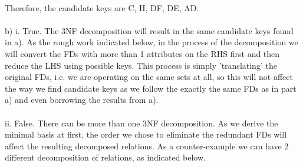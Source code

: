 \documentclass[12pt]{article}
\begin{document}
\\
Therefore, the candidate keys are C, H, DF, DE, AD.\\
\\
b) i. True. The 3NF decomposition will result in the same candidate keys found in a). As the rough work indicated below, in the process of the decomposition we will convert the FDs with more than 1 attributes on the RHS first and then reduce the LHS using possible keys. This process is simply 'translating' the original FDs, i.e. we are operating on the same sets at all, so this will not affect the way we find candidate keys as we follow the exactly the same FDs as in part a) and even borrowing the results from a).\\
\\
ii. False. There can be more than one 3NF decomposition. As we derive the minimal basis at first, the order we chose to eliminate the redundant FDs will affect the resulting decomposed relations. As a counter-example we can have 2 different decomposition of relations, as indicated below.
\end{document}
